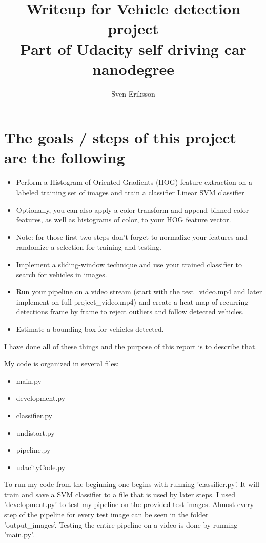 \documentclass[12pt,a4paper]{article}
\author{Sven Eriksson}
\title{Writeup for Vehicle detection project \\ \large{Part of Udacity self driving car nanodegree}}
\begin{document}
\maketitle

\section*{The goals / steps of this project are the following}
\begin{itemize}
\item Perform a Histogram of Oriented Gradients (HOG) feature extraction on a labeled training set of images and train a classifier Linear SVM classifier
\item Optionally, you can also apply a color transform and append binned color features, as well as histograms of color, to your HOG feature vector.
\item Note: for those first two steps don't forget to normalize your features and randomize a selection for training and testing.
\item Implement a sliding-window technique and use your trained classifier to search for vehicles in images.
\item Run your pipeline on a video stream (start with the test\_video.mp4 and later implement on full project\_video.mp4) and create a heat map of recurring detections frame by frame to reject outliers and follow detected vehicles.
\item Estimate a bounding box for vehicles detected.
\end{itemize}

I have done all of these things and the purpose of this report is to describe that.

My code is organized in several files:
\begin{itemize}
\item main.py
\item development.py
\item classifier.py
\item undistort.py
\item pipeline.py
\item udacityCode.py
\end{itemize}

To run my code from the beginning one begins with running 'classifier.py'. It will train and save a SVM classifier to a file that is used by later steps. I used 'development.py' to test my pipeline on the provided test images. Almost every step of the pipeline for every test image can be seen in the folder 'output\_images'. Testing the entire pipeline on a video is done by running 'main.py'.
\end{document}
